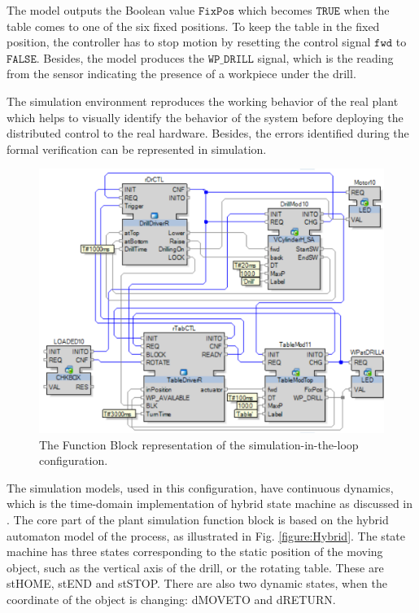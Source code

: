 \documentclass[conference]{IEEEtran}
\newcommand \com[1] {\ensuremath{\mathtt{#1}}}
\begin{document}
The model outputs the Boolean value \com{FixPos} which becomes \com{TRUE} when the table comes to one of the six fixed positions. To keep the table in the fixed position, the controller has to stop motion by resetting the control signal \com{fwd} to \com{FALSE}. Besides, the model produces the \com{WP\_DRILL} signal, which is the reading from the sensor indicating the presence of a workpiece under the drill.

The simulation environment reproduces the working behavior of the real plant which helps to visually identify the behavior of the system before deploying the distributed control to the real hardware. Besides, the errors identified during the formal verification can be represented in simulation. 

\begin{figure}
    \centering
    \includegraphics[scale = 0.3]{images/SimulationFBsystem.png}
    \caption{The Function Block representation of the  simulation-in-the-loop configuration.}
    \label{figure:SimulationFBDiagram}
\end{figure} 



The simulation models, used in this configuration, have continuous dynamics, which is the time-domain implementation of hybrid state machine as discussed in \cite{vyatkin2008closed}. 
The core part of the plant simulation function block is based on the hybrid automaton model of the process, as illustrated in Fig. \ref{figure:Hybrid}.
The state machine has three states corresponding to the static position of the moving object, such as the vertical axis of the drill, or the rotating table. These are {stHOME}, {stEND} and {stSTOP}. There are also two dynamic states, when the coordinate of the object is changing: {dMOVETO} and {dRETURN}. 
\end{document}
